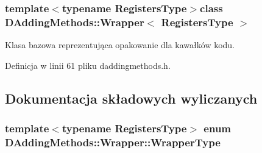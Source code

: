 \subsubsection*{template$<$typename Registers\-Type$>$class D\-Adding\-Methods\-::\-Wrapper$<$ Registers\-Type $>$}

Klasa bazowa reprezentująca opakowanie dla kawałków kodu. 

Definicja w linii 61 pliku daddingmethods.\-h.



\subsection{Dokumentacja składowych wyliczanych}
\hypertarget{class_d_adding_methods_1_1_wrapper_acb6db05ae66304ccd8b53c49221e0b09}{
\subsubsection[{Wrapper\-Type}]{\setlength{\rightskip}{0pt plus 5cm}template$<$typename Registers\-Type$>$ enum {\bf D\-Adding\-Methods\-::\-Wrapper\-::\-Wrapper\-Type}\hspace{0.3cm}{\ttfamily [strong]}}}\label{class_d_adding_methods_1_1_wrapper_acb6db05ae66304ccd8b53c49221e0b09}
